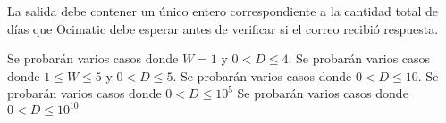 \documentclass{oci}
\begin{document}
\begin{outputDescription}
  La salida debe contener un único entero correspondiente a la cantidad total de
  días que Ocimatic debe esperar antes de verificar si el correo recibió
  respuesta.
\end{outputDescription}

\begin{scoreDescription}
   Se probarán varios casos donde $W=1$ y $0 < D \leq 4$.
   Se probarán varios casos donde $1 \leq W \leq 5$ y $0 < D \leq 5$.
   Se probarán varios casos donde $0 < D \leq 10$.
   Se probarán varios casos donde $0 < D \leq 10^5$
   Se probarán varios casos donde $0 < D \leq 10^{10}$
\end{scoreDescription}

\begin{sampleDescription}
\end{sampleDescription}
\end{document}
